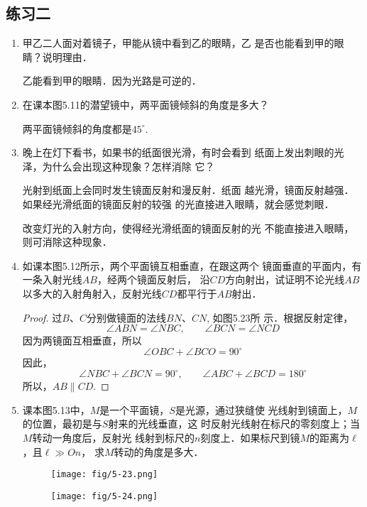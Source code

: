 \subsection{练习二}
\begin{enumerate}
    \item 甲乙二人面对着镜子，甲能从镜中看到乙的眼睛，乙
    是否也能看到甲的眼睛？说明理由．

    \begin{solution}
        乙能看到甲的眼睛．因为光路是可逆的．
    \end{solution}
    
    \item 在课本图5.11的潜望镜中，两平面镜倾斜的角度是多大？

    \begin{solution}
        两平面镜倾斜的角度都是$45^{\circ}$.
    \end{solution}
    
    \item 晚上在灯下看书，如果书的纸面很光滑，有时会看到
    纸面上发出刺眼的光泽，为什么会出现这种现象？怎样消除
    它？

    \begin{solution}
        光射到纸面上会同时发生镜面反射和漫反射．纸面
        越光滑，镜面反射越强．如果经光滑纸面的镜面反射的较强
        的光直接进入眼睛，就会感觉刺眼．

        改变灯光的入射方向，使得经光滑纸面的镜面反射的光
        不能直接进入眼睛，则可消除这种现象．
    \end{solution}

    \item 如课本图5.12所示，两个平面镜互相垂直，在跟这两个
    镜面垂直的平面内，有一条入射光线$AB$，经两个镜面反射后，
    沿$CD$方向射出，试证明不论光线$AB$以多大的入射角射入，反射光线$CD$都平行于$AB$射出．

    \begin{proof}
过$B$、$C$分别做镜面的法线$BN$、$CN$, 如图5.23所
示．根据反射定律，
\[\angle ABN=\angle NBC,\qquad \angle BCN=\angle NCD\]
因为两镜面互相垂直，所以
\[\angle OBC+\angle BCO=90^{\circ}\]
因此，
\[\angle NBC+\angle BCN=90^{\circ},\qquad 
\angle ABC+\angle BCD=180^{\circ}\]
所以，$AB\parallel CD$.
    \end{proof}
    \item 课本图5.13中，$M$是一个平面镜，$S$是光源，通过狭缝使
    光线射到镜面上，$M$的位置，最初是与$S$射来的光线垂直，这
    时反射光线射在标尺的零刻度上；当$M$转动一角度后，反射光
    线射到标尺的$n$刻度上．如果标尺到镜$M$的距离为$\ell$，且$\ell\gg On$，
    求$M$转动的角度是多大．
    \begin{figure}[htp]
        \centering
        \begin{minipage}[t]{0.48\textwidth}
        \centering
\texttt{[image: fig/5-23.png]}
        \caption{}
        \end{minipage}
        \begin{minipage}[t]{0.48\textwidth}
        \centering
\texttt{[image: fig/5-24.png]}
        \caption{}
        \end{minipage}
        \end{figure}


\end{enumerate}
